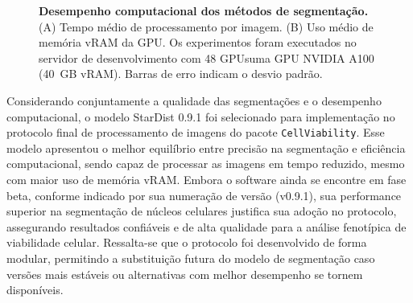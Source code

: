 \documentclass[12pt]{article}
\begin{document}
\begin{figure}[ht]
\centering

  \hfill

  \caption{\textbf{Desempenho computacional dos métodos de segmentação.} (A) Tempo médio de processamento por imagem. (B) Uso médio de memória vRAM da GPU. Os experimentos foram executados no servidor de desenvolvimento com 48 GPUsuma GPU NVIDIA A100 (40~GB vRAM). Barras de erro indicam o desvio padrão.}
  \label{fig:performance}
\end{figure}

Considerando conjuntamente a qualidade das segmentações e o desempenho computacional, o modelo StarDist 0.9.1 foi selecionado para implementação no protocolo final de processamento de imagens do pacote \texttt{CellViability}. Esse modelo apresentou o melhor equilíbrio entre precisão na segmentação e eficiência computacional, sendo capaz de processar as imagens em tempo reduzido, mesmo com maior uso de memória vRAM. Embora o software ainda se encontre em fase beta, conforme indicado por sua numeração de versão (v0.9.1), sua performance superior na segmentação de núcleos celulares justifica sua adoção no protocolo, assegurando resultados confiáveis e de alta qualidade para a análise fenotípica de viabilidade celular. Ressalta-se que o protocolo foi desenvolvido de forma modular, permitindo a substituição futura do modelo de segmentação caso versões mais estáveis ou alternativas com melhor desempenho se tornem disponíveis.
\end{document}
